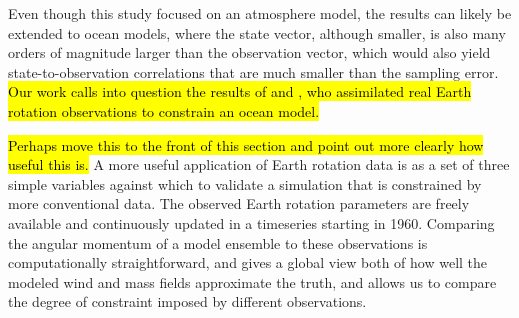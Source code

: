 Even though this study focused on an atmosphere model, the results can likely be extended to ocean models, where the state vector, although smaller, is also many orders of magnitude larger than the observation vector, which would also yield state-to-observation correlations that are much smaller than the sampling error. 
\hl{Our work calls into question the results of \citet{Saynisch2010,Saynisch2011} and \citet{Saynisch2012}, who assimilated real Earth rotation observations to constrain an ocean model.} 

\hl{Perhaps move this to the front of this section and point out more clearly how useful this is.}
A more useful application of Earth rotation data is as a set of three simple variables against which to validate a simulation that is constrained by more conventional data.  
The observed Earth rotation parameters are freely available \citep{iers} and continuously updated in a timeseries starting in 1960. 
Comparing the angular momentum of a model ensemble to these observations is computationally straightforward, and 
gives a global view both of how well the modeled wind and mass fields approximate the truth, and allows us to compare the degree of constraint imposed by different observations. 



